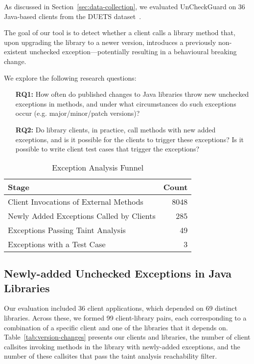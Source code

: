 As discussed in Section~\ref{sec:data-collection}, we evaluated UnCheckGuard on 36 Java-based clients from the DUETS dataset~\cite{durieux21:_duets}.

The goal of our tool is to detect whether a client calls a library method that, upon upgrading the library to a newer version, introduces a previously non-existent unchecked exception—potentially resulting in a behavioural breaking change.

We explore the following research questions:

\begin{itemize}
  \item[\textbf{RQ1:}] How often do published changes to Java libraries throw new unchecked exceptions in methods,
and under what circumstances do such exceptions occur (e.g. major/minor/patch versions)?
  \item[\textbf{RQ2:}]  Do library clients, in practice, call methods with new added exceptions, and is it possible for the clients to trigger these exceptions? Is it possible to write client test cases that trigger the exceptions?
\end{itemize}


\begin{table}[h]
\centering
\caption{Exception Analysis Funnel}
\label{tab:exception-funnel}
\begin{tabular}{l r}
\toprule
\textbf{Stage} & \textbf{Count} \\
\midrule
Client Invocations of External Methods & 8048 \\
Newly Added Exceptions Called by Clients & 285 \\
Exceptions Passing Taint Analysis & 49 \\
Exceptions with a Test Case & 3 \\
\bottomrule
\end{tabular}
\end{table}


\subsection{Newly-added Unchecked Exceptions in Java Libraries}

Our evaluation included 36 client applications, which depended on 69 distinct libraries. Across these, we formed 99 client-library pairs, each corresponding to a combination of a specific client and one of the libraries that it depends on. Table~\ref{tab:version-changes} presents our clients and libraries, the number of client callsites invoking methods in the library with newly-added exceptions, and the number of these callsites that pass the taint analysis reachability filter.

